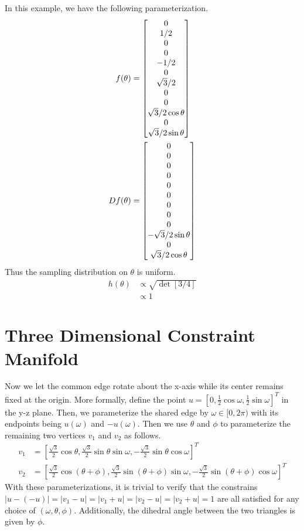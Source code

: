 \documentclass[12pt]{article}
\newcommand*{\Scale}[2][4]{\scalebox{#1}{$#2$}}%
\begin{document}
In this example, we have the following parameterization. 
\begin{align}
f(\theta) &= \Scale[1.0]{\begin{bmatrix}
0 \\ 1/2 \\ 0 \\ 0 \\ -1/2 \\ 0 \\ \sqrt{3}/2 \\ 0 \\ 0 \\\sqrt{3}/2 \cos\theta \\ 0 \\ \sqrt{3}/2\sin\theta
\end{bmatrix}} \\
Df(\theta) &= \Scale[1.0]{\begin{bmatrix}
0 \\ 0 \\ 0 \\ 0 \\ 0 \\ 0 \\ 0 \\ 0 \\ 0 \\ -\sqrt{3}/2\sin\theta \\ 0 \\ \sqrt{3}/2\cos\theta
\end{bmatrix}} 
\end{align}
Thus the sampling distribution on $\theta$ is uniform. 
\begin{align}
h(\theta) &\propto \sqrt{\det\left[3/4\right]}\\
&\propto 1
\end{align}

\section{Three Dimensional Constraint Manifold}

Now we let the common edge rotate about the x-axis while its center remains fixed at the origin. More formally, define the point $u = \left[0, \frac{1}{2}\cos\omega, \frac{1}{2}\sin\omega\right]^T$ in the y-z plane. Then, we parameterize the shared edge by $\omega \in [0, 2\pi)$ with its endpoints being $u(\omega)$ and $-u(\omega)$. Then we use $\theta$ and $\phi$ to parameterize the remaining two vertices $v_1$ and $v_2$ as follows.
\begin{align}
v_1 &= \left[\frac{\sqrt{3}}{2}\cos\theta, \frac{\sqrt{3}}{2}\sin\theta\sin\omega, -\frac{\sqrt{3}}{2}\sin\theta\cos\omega\right]^T \\ 
v_2 &= \left[\frac{\sqrt{3}}{2}\cos(\theta+\phi), \frac{\sqrt{3}}{2}\sin(\theta+\phi)\sin\omega, -\frac{\sqrt{3}}{2}\sin(\theta+\phi)\cos\omega\right]^T 
\end{align}
With these parameterizations, it is trivial to verify that the constrains $|u - (-u)| = |v_1 - u| = |v_1 + u| =|v_2 - u| = |v_2 + u| = 1$ are all satisfied for any choice of $(\omega, \theta, \phi)$. Additionally, the dihedral angle between the two triangles is given by $\phi$. 
\end{document}
